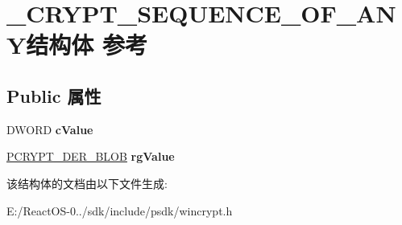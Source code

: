 \hypertarget{struct___c_r_y_p_t___s_e_q_u_e_n_c_e___o_f___a_n_y}{}\section{\+\_\+\+C\+R\+Y\+P\+T\+\_\+\+S\+E\+Q\+U\+E\+N\+C\+E\+\_\+\+O\+F\+\_\+\+A\+N\+Y结构体 参考}
\label{struct___c_r_y_p_t___s_e_q_u_e_n_c_e___o_f___a_n_y}
\subsection*{Public 属性}
\begin{DoxyCompactItemize}
\item 
\mbox{\label{struct___c_r_y_p_t___s_e_q_u_e_n_c_e___o_f___a_n_y_afe2b2e5e2678f1c4d61934083fafb985}} 
D\+W\+O\+RD {\bfseries c\+Value}
\item 
\mbox{\label{struct___c_r_y_p_t___s_e_q_u_e_n_c_e___o_f___a_n_y_a568bf0e206ef33a6319125e8850ab2b2}} 
\hyperlink{struct___c_r_y_p_t_o_a_p_i___b_l_o_b}{P\+C\+R\+Y\+P\+T\+\_\+\+D\+E\+R\+\_\+\+B\+L\+OB} {\bfseries rg\+Value}
\end{DoxyCompactItemize}


该结构体的文档由以下文件生成\+:\begin{DoxyCompactItemize}
\item 
E\+:/\+React\+O\+S-\/0../sdk/include/psdk/wincrypt.\+h\end{DoxyCompactItemize}
